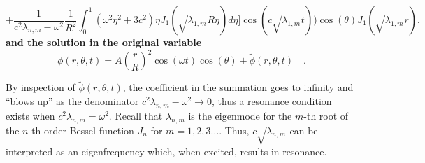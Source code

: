\documentclass{homework}
\begin{document}
$$ + \frac{1}{c^2 \lambda_{n,m} - \omega^2} \frac{1}{R^2} \int_0^1 \left(\omega^2 \eta^2 + 3c^2 \right) \eta J_1 \left(\sqrt{\lambda_{1,m}} R \eta \right) d\eta \Bigg] \cos \left(c \sqrt{\lambda_{1,m}} t \right) \Biggl) \cos(\theta) J_1 \left(\sqrt{\lambda_{1,m} } r \right) .$$
\noindent
\textbf{and the solution in the original variable}
$$ \phi(r, \theta, t) = A \left(\frac{r}{R} \right)^2 \cos(\omega t) \cos(\theta) + \tilde{\phi} (r, \theta, t) \quad .$$ 

\noindent By inspection of $\tilde{\phi}(r, \theta, t)$, the coefficient in the summation goes to infinity and ``blows up'' as the denominator $c^2 \lambda_{n,m} - \omega^2 \rightarrow 0$, thus a resonance condition exists when $c^2 \lambda_{n,m} = \omega^2$. Recall that $\lambda_{n,m}$ is the eigenmode for the $m$-th root of the $n$-th order Bessel function $J_n$ for $m = 1,2,3 \dots$. Thus, $c \sqrt{\lambda_{n,m}}$ can be interpreted as an eigenfrequency which, when excited, results in resonance.
\end{document}
